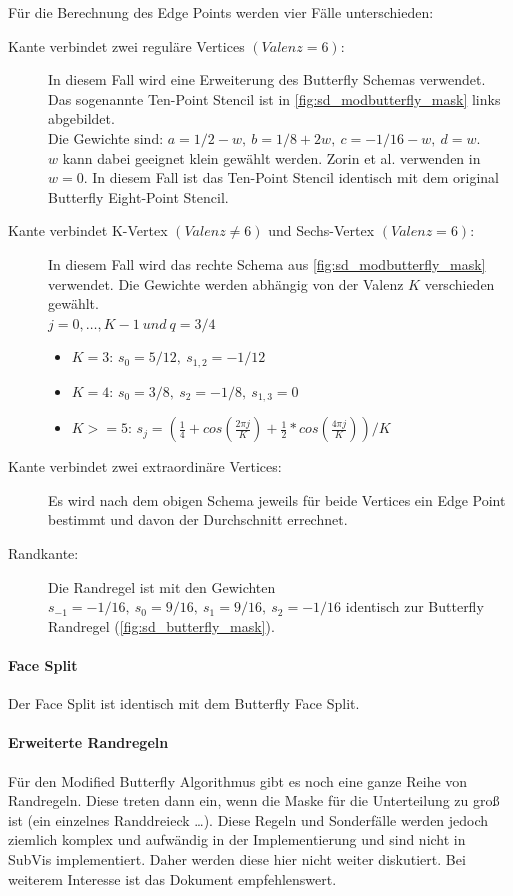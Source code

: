 Für die Berechnung des Edge Points werden vier Fälle unterschieden:
\begin{description}
\item[Kante verbindet zwei reguläre Vertices \((Valenz = 6)\):]
In diesem Fall wird eine Erweiterung
des Butterfly Schemas verwendet. Das sogenannte Ten-Point Stencil ist in \autoref{fig:sd_modbutterfly_mask} links abgebildet.\\
Die Gewichte sind:
\(a = 1/2 - w,\ b = 1/8 + 2w,\ c = -1/16 - w,\ d = w\).\\
\(w\) kann dabei geeignet klein gewählt werden.
Zorin et al. verwenden in \cite{Zorin:1996:ISM:237170.237254} \(w = 0\).
In diesem Fall ist das Ten-Point Stencil identisch mit dem original
Butterfly Eight-Point Stencil.
\item[Kante verbindet K-Vertex \((Valenz \neq 6)\) und Sechs-Vertex \((Valenz = 6)\):]
In diesem Fall wird das rechte Schema aus \autoref{fig:sd_modbutterfly_mask} verwendet.
Die Gewichte werden abhängig von der Valenz \(K\) verschieden gewählt.\\
\(j = 0, \ldots, K - 1\ und\ q = 3/4\)
\begin{itemize}
 \item \(K = 3\): \(s_0 = 5/12,\ s_{1,2} = -1/12\)
 \item \(K = 4\): \(s_0 = 3/8,\ s_{2} = -1/8,\ s_{1,3} = 0\)
 \item \(K >= 5\): \(s_j = (\frac{1}{4}+ cos(\frac{2 \pi j}{K}) + \frac{1}{2} * cos(\frac{4 \pi j}{K}))/K\)
\end{itemize}
\item[Kante verbindet zwei extraordinäre Vertices:]
Es wird nach dem obigen Schema jeweils für beide Vertices ein Edge Point bestimmt und
davon der Durchschnitt errechnet.
\item[Randkante:] Die Randregel ist mit den Gewichten
\(s_{-1} = -1/16,\ s_0 = 9/16,\ s_1 = 9/16,\ s_2 = -1/16\)
identisch zur Butterfly Randregel
(\autoref{fig:sd_butterfly_mask}).
\end{description}
\cite{Zorin:1996:ISM:237170.237254}
\cite[S. 72 ff.]{Zorin.subdivcourse}
\cite{Gamasutra}
\cite{Sharp}


\paragraph*{Face Split}
Der Face Split ist identisch mit dem Butterfly Face Split.
\cite{Zorin:1996:ISM:237170.237254}
\cite[S. 72ff]{Zorin.subdivcourse}

\paragraph*{Erweiterte Randregeln}

Für den Modified Butterfly Algorithmus gibt es noch eine ganze Reihe von
Randregeln. Diese treten dann ein, wenn die Maske für die Unterteilung zu groß ist
(ein einzelnes Randdreieck \ldots).
Diese Regeln und Sonderfälle werden jedoch ziemlich komplex und aufwändig in der Implementierung
und sind nicht in SubVis implementiert. Daher werden diese hier nicht weiter diskutiert.
Bei weiterem Interesse ist das Dokument \cite[S. 74 f.]{Zorin.subdivcourse}
empfehlenswert.
